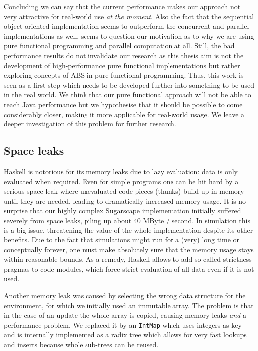 Concluding we can say that the current performance makes our approach not very attractive for real-world use \textit{at the moment}. Also the fact that the sequential object-oriented implementation seems to outperform the concurrent and parallel implementations as well, seems to question our motivation as to why we are using pure functional programming and parallel computation at all. Still, the bad performance results do not invalidate our research as this thesis aim is not the development of high-performance pure functional implementations but rather exploring concepts of ABS in pure functional programming. Thus, this work is seen as a first step which needs to be developed further into something to be used in the real world. We think that our pure functional approach will not be able to reach Java performance but we hypothesise that it should be possible to come considerably closer, making it more applicable for real-world usage. We leave a deeper investigation of this problem for further research.

\subsection{Space leaks}
Haskell is notorious for its memory leaks due to lazy evaluation: data is only evaluated when required. Even for simple programs one can be hit hard by a serious space leak where unevaluated code pieces (thunks) build up in memory until they are needed, leading to dramatically increased memory usage. It is no surprise that our highly complex Sugarscape implementation initially suffered severely from space leaks, piling up about 40 MByte / second. In simulation this is a big issue, threatening the value of the whole implementation despite its other benefits. Due to the fact that simulations might run for a (very) long time or conceptually forever, one must make absolutely sure that the memory usage stays within reasonable bounds. As a remedy, Haskell allows to add so-called strictness pragmas to code modules, which force strict evaluation of all data even if it is not used. %

Another memory leak was caused by selecting the wrong data structure for the environment, for which we initially used an immutable array. The problem is that in the case of an update the whole array is copied, causing memory leaks \textit{and} a performance problem. We replaced it by an \texttt{IntMap} which uses integers as key and is internally implemented as a radix tree which allows for very fast lookups and inserts because whole sub-trees can be reused.


